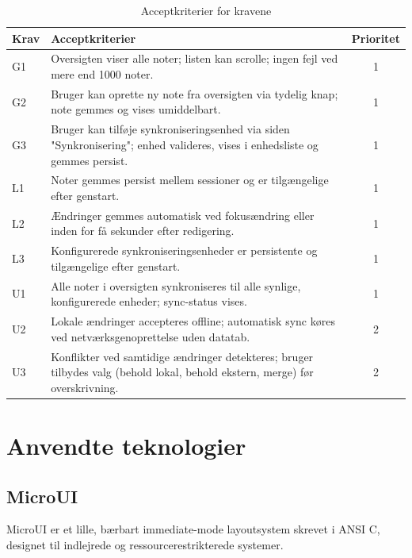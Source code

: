\documentclass{article}
\begin{document}
\begin{table}[ht]
  \centering
  \begin{tabular}{|l|p{8.5cm}|c|}
    \hline
    \textbf{Krav} & \textbf{Acceptkriterier} & \textbf{Prioritet} \\
    \hline
    G1 & Oversigten viser alle noter; listen kan scrolle;
         ingen fejl ved mere end 1000 noter. & 1 \\
    \hline
    G2 & Bruger kan oprette ny note fra oversigten via tydelig knap;
         note gemmes og vises umiddelbart. & 1 \\
    \hline
    G3 & Bruger kan tilføje synkroniseringsenhed via siden "Synkronisering";
         enhed valideres, vises i enhedsliste og gemmes persist. & 1 \\
    \hline
    L1 & Noter gemmes persist mellem sessioner og
         er tilgængelige efter genstart. & 1 \\
    \hline
    L2 & Ændringer gemmes automatisk ved fokusændring eller
         inden for få sekunder efter redigering. & 1 \\
    \hline
    L3 & Konfigurerede synkroniseringsenheder er persistente og
         tilgængelige efter genstart. & 1 \\
    \hline
    U1 & Alle noter i oversigten synkroniseres til alle synlige,
         konfigurerede enheder; sync-status vises. & 1 \\
    \hline
    U2 & Lokale ændringer accepteres offline;
         automatisk sync køres ved netværksgenoprettelse uden datatab. & 2 \\
    \hline
    U3 & Konflikter ved samtidige ændringer detekteres;
         bruger tilbydes valg (behold lokal, behold ekstern, merge)
         før overskrivning. & 2 \\
    \hline
  \end{tabular}
  \caption{Acceptkriterier for kravene}
  \label{tab:acceptkriterier}
\end{table}

\section{Anvendte teknologier}

\subsection{MicroUI}
MicroUI er et lille, bærbart immediate-mode layoutsystem skrevet i ANSI C,
designet til indlejrede og ressourcerestrikterede systemer.
\end{document}
